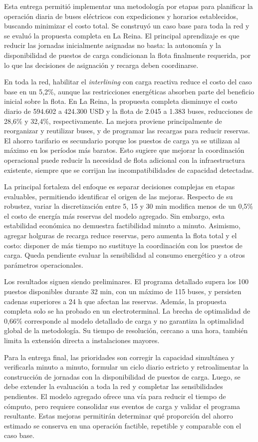 Esta entrega permitió implementar una metodología por etapas para planificar la operación diaria de buses eléctricos con expediciones y horarios establecidos, buscando minimizar el costo total. Se construyó un caso base para toda la red y se evaluó la propuesta completa en La Reina. El principal aprendizaje es que reducir las jornadas inicialmente asignadas no basta: la autonomía y la disponibilidad de puestos de carga condicionan la flota finalmente requerida, por lo que las decisiones de asignación y recarga deben coordinarse.

En toda la red, habilitar el \textit{interlining} con carga reactiva reduce el costo del caso base en un 5,2\%, aunque las restricciones energéticas absorben parte del beneficio inicial sobre la flota. En La Reina, la propuesta completa disminuye el costo diario de 594.602 a 424.300 USD y la flota de 2.045 a 1.383 buses, reducciones de 28,6\% y 32,4\%, respectivamente. La mejora proviene principalmente de reorganizar y reutilizar buses, y de programar las recargas para reducir reservas. El ahorro tarifario es secundario porque los puestos de carga ya se utilizan al máximo en los períodos más baratos. Esto sugiere que mejorar la coordinación operacional puede reducir la necesidad de flota adicional con la infraestructura existente, siempre que se corrijan las incompatibilidades de capacidad detectadas.

La principal fortaleza del enfoque es separar decisiones complejas en etapas evaluables, permitiendo identificar el origen de las mejoras. Respecto de su robustez, variar la discretización entre 5, 15 y 30 min modifica menos de un 0,5\% el costo de energía más reservas del modelo agregado. Sin embargo, esta estabilidad económica no demuestra factibilidad minuto a minuto. Asimismo, agregar holguras de recarga reduce reservas, pero aumenta la flota total y el costo: disponer de más tiempo no sustituye la coordinación con los puestos de carga. Queda pendiente evaluar la sensibilidad al consumo energético y a otros parámetros operacionales.

Los resultados siguen siendo preliminares. El programa detallado supera los 100 puestos disponibles durante 32 min, con un máximo de 115 buses, y persisten cadenas superiores a 24 h que afectan las reservas. Además, la propuesta completa solo se ha probado en un electroterminal. La brecha de optimalidad de 0,66\% corresponde al modelo detallado de carga y no garantiza la optimalidad global de la metodología. Su tiempo de resolución, cercano a una hora, también limita la extensión directa a instalaciones mayores.

Para la entrega final, las prioridades son corregir la capacidad simultánea y verificarla minuto a minuto, formular un ciclo diario estricto y retroalimentar la construcción de jornadas con la disponibilidad de puestos de carga. Luego, se debe extender la evaluación a toda la red y completar las sensibilidades pendientes. El modelo agregado ofrece una vía para reducir el tiempo de cómputo, pero requiere consolidar sus eventos de carga y validar el programa resultante. Estas mejoras permitirán determinar qué proporción del ahorro estimado se conserva en una operación factible, repetible y comparable con el caso base.
